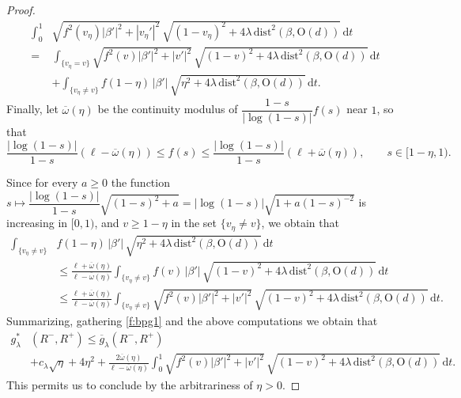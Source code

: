 \documentclass[a4paper,reqno]{amsart}
\newcommand\dist{{\mathrm{dist}}}
\newcommand\dt{{\,\mathrm{d}t}}
\theoremstyle{remark}
\newcommand{\ol}{\overline}
\newcommand{\On}{\mathrm{O}(d)}
\numberwithin{equation}{section}
\begin{document}
\begin{proof}
\[\begin{split}
	\int_{0}^{1} & \sqrt{f^2(v_\eta) |\beta'|^2+|v_\eta'|^2}\, \sqrt{(1-v_\eta)^2 + 4 \lambda \, \dist^2(\beta, \On)}\dt
	\\  =&
	\int_{\{v_\eta=v\}}	  \sqrt{f^2(v) |\beta'|^2+|v'|^2}\, \sqrt{(1-v)^2 + 4 \lambda \, \dist^2(\beta, \On)}\dt \\ &
	+ \int_{\{v_\eta \neq v\}}	f(1-\eta)\,  |\beta'|\, \sqrt{\eta^2 + 4 \lambda \, \dist^2(\beta, \On)}\dt.
\end{split}
\]  
Finally, let $\ol\omega(\eta)$ be the continuity modulus of $\dfrac{1-s}{|\log(1-s)|}f(s)$ near $1$, so that
\begin{equation}\label{eq-approx-f}
\dfrac{|\log(1-s)|}{1-s} (\ell-\ol \omega(\eta)) \leq f(s) \leq \dfrac{|\log(1-s)|}{1-s} (\ell+\ol \omega(\eta)) , \qquad s\in [1-\eta,1).
\end{equation}

Since for every $a\geq 0$ the function 
$
s \mapsto \dfrac{|\log(1-s)|}{1-s} \sqrt{(1-s)^2+a}=
|\log(1-s)| \sqrt{1+ a(1-s)^{-2}}$
is increasing in $[0,1)$, and $v\geq 1-\eta$ in the set $\{v_\eta \neq v\}$, we obtain that
\begin{equation}
	\begin{split}\label{eq-estimate-truncation}
		\int_{\{v_\eta \neq v\}} &	f(1-\eta)\,  |\beta'|\, \sqrt{\eta^2 + 4 \lambda \, \dist^2(\beta, \On)}\dt 
		\\ & \leq 
		\frac{\ell+\ol \omega(\eta)}{\ell-\ol \omega(\eta)}\int_{\{v_\eta \neq v\}}	f(v)\,  |\beta'|\, \sqrt{(1-v)^2 + 4 \lambda \, \dist^2(\beta, \On)}\dt
		\\ & \leq 
		\frac{\ell+\ol \omega(\eta)}{\ell-\ol \omega(\eta)}\int_{\{v_\eta \neq v\}}	 \sqrt{f^2(v) |\beta'|^2+|v'|^2}\, \sqrt{(1-v)^2 + 4 \lambda \, \dist^2(\beta, \On)}\dt.
	\end{split}
\end{equation}
Summarizing,  gathering \eqref{f:bpg1} and the above computations we obtain that
\begin{equation}\label{eqgstarolgfinal}
\begin{split}
g^*_\lambda & ( R^-,  R^+)  \leq \ol g_\lambda(  R^-,  R^+)  \\ &
+ c_\lambda \sqrt{\eta}+4\eta^2+
\frac{2\ol \omega(\eta)}{\ell-\ol \omega(\eta)} \int_{0}^{1}  \sqrt{f^2(v) |\beta'|^2+|v'|^2}\, \sqrt{(1-v)^2 + 4 \lambda \, \dist^2(\beta, \On)}\dt.
\end{split}
\end{equation}
This permits us to conclude by the arbitrariness of $\eta>0$.
\end{proof}
\end{document}

